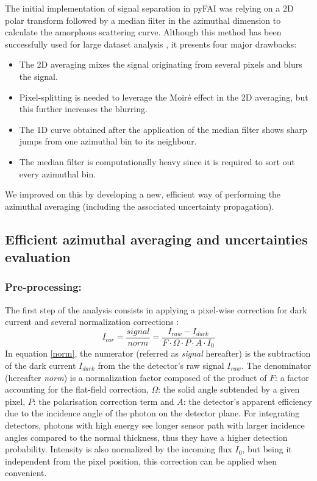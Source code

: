 \documentclass[preprint]{iucr}              %
\begin{document}
The initial implementation of signal separation in pyFAI \cite{pdj2013} was relying on a 2D polar transform followed by a median filter in the azimuthal dimension to calculate the amorphous scattering curve.
Although this method has been successfully used for large dataset analysis \cite{brocades}, it presents four major drawbacks:
\begin{itemize}
\item The 2D averaging mixes the signal originating from several pixels and blurs the signal. 
\item Pixel-splitting is needed to leverage the Moiré effect in the 2D averaging, but this further increases the blurring. 
\item The 1D curve obtained after the application of the median filter shows sharp jumps from one azimuthal bin to its neighbour.
\item The median filter is computationally heavy since it is required to sort out every azimuthal bin.
\end{itemize}

We improved on this by developing a new, efficient way of performing the azimuthal averaging (including the associated uncertainty propagation). 

\subsection{Efficient azimuthal averaging and uncertainties evaluation}

\subsubsection{Pre-processing:}
The first step of the analysis consists in applying a pixel-wise correction for dark current and several normalization corrections \cite{pyfai_2020}:
\begin{equation}
\label{norm}
I_{cor} = \frac{signal}{norm}  = \frac{I_{raw} - I_{dark}}{F \cdot
\Omega \cdot P \cdot A \cdot I_0} 
\end{equation}
In  equation \ref{norm}, the numerator (referred as \textit{signal} hereafter) is the subtraction of the dark current $I_{dark}$ from the the detector's raw signal $I_{raw}$.
The denominator (hereafter \textit{norm}) is a normalization factor composed of the product of  $F$:  a factor accounting for the flat-field correction, $\Omega$: the solid angle subtended by a given pixel, $P$: the polarisation correction term and $A$: the detector's apparent efficiency due to the incidence angle of the photon on the detector plane. 
For integrating detectors, photons with high energy see longer sensor path with larger incidence angles compared to the normal thickness, thus they have a higher detection probability.
Intensity is also normalized by the incoming flux $I_0$, but being it independent from the pixel position, this correction can be applied when convenient.
\end{document}
